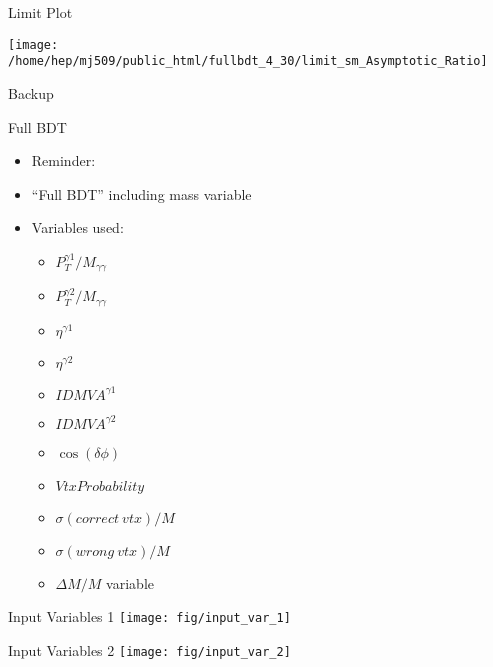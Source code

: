 \documentclass[t, 8pt]{beamer}
\begin{document}
\begin{frame}{Limit Plot}
\begin{center}
    \texttt{[image: /home/hep/mj509/public\_html/fullbdt\_4\_30/limit\_sm\_Asymptotic\_Ratio]}
\end{center}
\end{frame}



\begin{frame}{Backup}
\end{frame}

\begin{frame}{Full BDT}
  \begin{itemize}  
  \item Reminder:
  \item ``Full BDT'' including mass variable
  \item Variables used:
  \begin{itemize}  
    \item $P_T^{\gamma 1} / M_{\gamma \gamma}$
    \item $P_T^{\gamma 2} / M_{\gamma \gamma}$
    \item $\eta^{\gamma 1}$
    \item $\eta^{\gamma 2}$
    \item $ID MVA^{\gamma 1}$
    \item $ID MVA^{\gamma 2}$
    \item $\cos( \delta \phi )$
    \item $Vtx Probability$
    \item $\sigma(correct ~vtx)/M$
    \item $\sigma(wrong ~vtx)/M$
    \item \alert{$\Delta M/M$ variable}
  \end{itemize}
  \end{itemize}
\end{frame}

\begin{frame}{Input Variables 1}
    \texttt{[image: fig/input\_var\_1]}
\end{frame}

\begin{frame}{Input Variables 2}
    \texttt{[image: fig/input\_var\_2]}
\end{frame}
\end{document}
